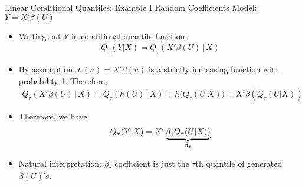 \documentclass[aspectratio=169, handout]{beamer}
\begin{document}
{\footnotesize
\begin{frame}{Linear Conditional Quantiles: Example I}
Random Coefficients Model:
$Y = X'\beta(U)$
\begin{itemize}
  \item Writing out $Y$ in conditional quantile function:
    \begin{align*}
      Q_\tau(Y|X)
      =
      Q_\tau(X'\beta(U)\,|\,X)
    \end{align*}

  \pause
  \item By assumption, $h(u)= X'\beta(u)$ is a strictly increasing
    function with probability 1.
    Therefore,
    \begin{align*}
      Q_\tau(X'\beta(U)\,|\,X)
      =
      Q_\tau(h(U)\,|\,X)
      =
      h\big(
      Q_\tau(U|X)
      \big)
      =
      X'\beta(Q_\tau(U|X))
    \end{align*}

  \pause
  \item
    Therefore, we have
    \begin{align*}
      Q_\tau(Y|X)
      =
      X'
      \underbrace{%
        \beta(Q_\tau(U|X))
      }_{\beta_\tau}
    \end{align*}

  \pause
  \item
    Natural interpretation:
    $\beta_\tau$ coefficient is just the $\tau$th quantile of
    generated $\beta(U)$'s.
\end{itemize}
\end{frame}
}
\end{document}
